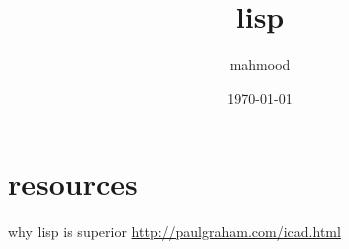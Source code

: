 \documentclass[a4paper,12pt]{article}
\author{mahmood}
\date{\today}
\title{lisp}
\begin{document}
\maketitle
\section{resources}
\label{sec:org7f3dddc}
why lisp is superior \url{http://paulgraham.com/icad.html}
\end{document}
